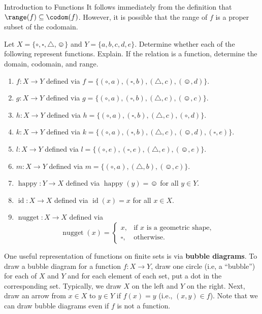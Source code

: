 \begin{section}{Introduction to Functions}
It follows immediately from the definition that $\range(f)\subseteq \codom(f)$.  However, it is possible that the range of $f$ is a proper subset of the codomain.

\begin{exercise}\label{exer:lots}
Let $X=\{\circ, \square,\triangle,\smiley\}$ and $Y=\{a,b,c,d,e\}$.  Determine whether each of the following represent functions.  Explain.  If the relation is a function, determine the domain, codomain, and range.

\begin{enumerate}[label=\textrm{(\alph*)}]
\item $f:X\to Y$ defined via $f=\{(\circ, a),(\square,b),(\triangle,c),(\smiley,d)\}$.
\item $g:X\to Y$ defined via $g=\{(\circ, a),(\square,b),(\triangle,c),(\smiley,c)\}$.
\item $h:X\to Y$ defined via $h=\{(\circ, a),(\square,b),(\triangle,c),(\circ,d)\}$.
\item $k:X\to Y$ defined via $k=\{(\circ, a),(\square,b),(\triangle,c),(\smiley,d),(\square,e)\}$.
\item $l:X\to Y$ defined via $l=\{(\circ, e),(\square,e),(\triangle,e),(\smiley,e)\}$.
\item $m:X\to Y$ defined via $m=\{(\circ, a),(\triangle,b),(\smiley,c)\}$.
\item $\operatorname{happy}:Y\to X$ defined via $\operatorname{happy}(y)=\smiley$ for all $y\in Y$.
\item $\operatorname{id}:X\to X$ defined via $\operatorname{id}(x)=x$ for all $x\in X$.
\item $\operatorname{nugget}:X\to X$ defined via 
\[
\operatorname{nugget}(x)=\begin{cases}
x, & \mbox{if } x\mbox{ is a geometric shape},\\
\square, & \mbox{otherwise}.
\end{cases}
\]
\end{enumerate}
\end{exercise}

One useful representation of functions on finite sets is via \textbf{bubble diagrams}.  To draw a bubble diagram for a function $f:X\to Y$, draw one circle (i.e, a ``bubble'') for each of $X$ and $Y$ and for each element of each set, put a dot in the corresponding set.  Typically, we draw $X$ on the left and $Y$ on the right.  Next, draw an arrow from $x\in X$ to $y\in Y$ if $f(x)=y$ (i.e., $(x,y)\in f$). Note that we can draw bubble diagrams even if $f$ is not a function. 


\end{section}
